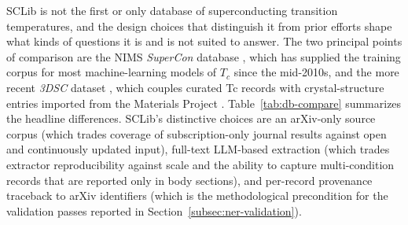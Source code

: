 \documentclass[11pt]{article}
\begin{document}
SCLib is not the first or only database of superconducting transition temperatures, and the design choices that distinguish it from prior efforts shape what kinds of questions it is and is not suited to answer. The two principal points of comparison are the NIMS \emph{SuperCon} database \cite{nims_supercon,stanev2018supercondatabase}, which has supplied the training corpus for most machine-learning models of $T_c$ since the mid-2010s, and the more recent \emph{3DSC} dataset \cite{sommer20223dsc}, which couples curated Tc records with crystal-structure entries imported from the Materials Project \cite{jain2013materialsproject}. Table~\ref{tab:db-compare} summarizes the headline differences. SCLib's distinctive choices are an arXiv-only source corpus (which trades coverage of subscription-only journal results against open and continuously updated input), full-text LLM-based extraction (which trades extractor reproducibility against scale and the ability to capture multi-condition records that are reported only in body sections), and per-record provenance traceback to arXiv identifiers (which is the methodological precondition for the validation passes reported in Section~\ref{subsec:ner-validation}).
\end{document}
